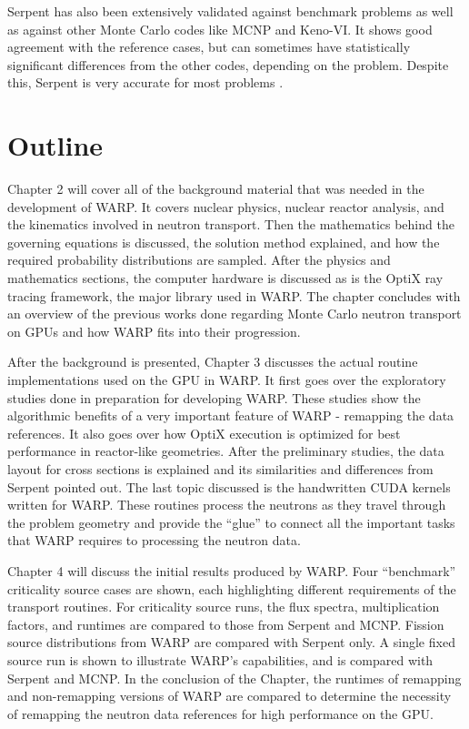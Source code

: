 Serpent has also been extensively validated against benchmark problems as well as against other Monte Carlo codes like MCNP and Keno-VI.  It shows good agreement  with the reference cases, but can sometimes have statistically significant differences from the other codes, depending on the problem.  Despite this, Serpent is very accurate for most problems \cite{serpent}.

\section{Outline}

Chapter 2 will cover all of the background material that was needed in the development of WARP.  It covers nuclear physics, nuclear reactor analysis, and the kinematics involved in neutron transport.  Then the mathematics behind the governing equations is discussed, the solution method explained, and how the required probability distributions are sampled.  After the physics and mathematics sections, the computer hardware is discussed as is the OptiX ray tracing framework, the major library used in WARP.  The chapter concludes with an overview of the previous works done regarding Monte Carlo neutron transport on GPUs and how WARP fits into their progression.

After the background is presented, Chapter 3 discusses the actual routine implementations used on the GPU in WARP.  It first goes over the exploratory studies done in preparation for developing WARP.  These studies show the algorithmic benefits of a very important feature of WARP - remapping the data references.  It also goes over how OptiX execution is optimized for best performance in reactor-like geometries.  After the preliminary studies, the data layout for cross sections is explained and its similarities and differences from Serpent pointed out.  The last topic discussed is the handwritten CUDA kernels written for WARP.  These routines process the neutrons as they travel through the problem geometry and provide the ``glue'' to connect all the important tasks that WARP requires to processing the neutron data.

Chapter 4 will discuss the initial results produced by WARP.  Four ``benchmark'' criticality source cases are shown, each highlighting different requirements of the transport routines.  For criticality source runs, the flux spectra, multiplication factors, and runtimes are compared to those from Serpent and MCNP.  Fission source distributions from WARP are compared with Serpent only.  A single fixed source run is shown to illustrate WARP's capabilities, and is compared with Serpent and MCNP.  In the conclusion of the Chapter, the runtimes of remapping and non-remapping versions of WARP are compared to determine the necessity of remapping the neutron data references for high performance on the GPU.

